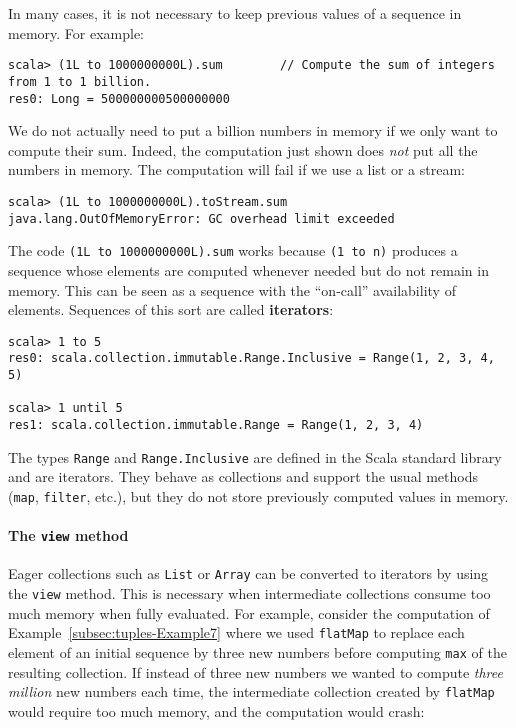 In many cases, it is not necessary to keep previous values of a sequence
in memory. For example:

\begin{lstlisting}
scala> (1L to 1000000000L).sum        // Compute the sum of integers from 1 to 1 billion.
res0: Long = 500000000500000000
\end{lstlisting}
We do not actually need to put a billion numbers in memory if we only
want to compute their sum. Indeed, the computation just shown does
\emph{not} put all the numbers in memory. The computation will fail
if we use a list or a stream: 
\begin{lstlisting}
scala> (1L to 1000000000L).toStream.sum
java.lang.OutOfMemoryError: GC overhead limit exceeded
\end{lstlisting}

The code \lstinline!(1L to 1000000000L).sum! works because \lstinline!(1 to n)!
produces a sequence whose elements are computed whenever needed but
do not remain in memory. This can be seen as a sequence with the \textsf{``}on-call\textsf{''}
availability of elements. Sequences of this sort are called \textbf{iterators}:
\begin{lstlisting}
scala> 1 to 5
res0: scala.collection.immutable.Range.Inclusive = Range(1, 2, 3, 4, 5)

scala> 1 until 5
res1: scala.collection.immutable.Range = Range(1, 2, 3, 4)
\end{lstlisting}
The types \lstinline!Range! and \lstinline!Range.Inclusive! are
defined in the Scala standard library and are iterators. They behave
as collections and support the usual methods (\lstinline!map!, \lstinline!filter!,
etc.), but they do not store previously computed values in memory.

\paragraph{The \texttt{view} method}

Eager collections such as \lstinline!List! or \lstinline!Array!
can be converted to iterators by using the \lstinline!view! method.
This is necessary when intermediate collections consume too much memory
when fully evaluated. For example, consider the computation of Example~\ref{subsec:tuples-Example7}
where we used \lstinline!flatMap! to replace each element of an initial
sequence by three new numbers before computing \lstinline!max! of
the resulting collection. If instead of three new numbers we wanted
to compute \emph{three} \emph{million} new numbers each time, the
intermediate collection created by \lstinline!flatMap! would require
too much memory, and the computation would crash:

